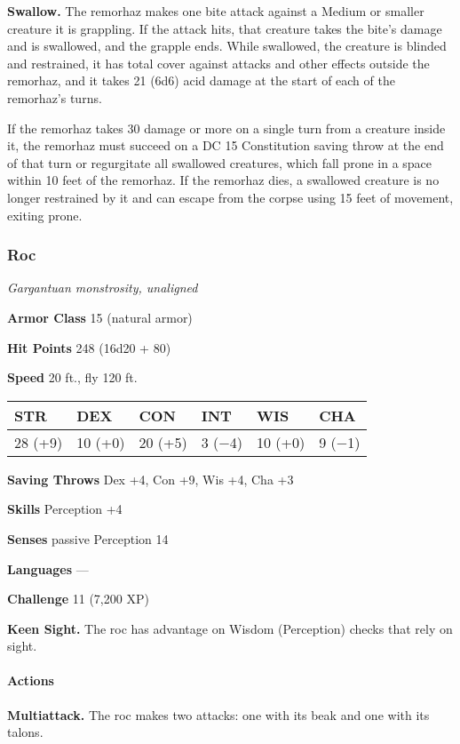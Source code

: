 \documentclass[
]{article}
\begin{document}
\textbf{Swallow.} The remorhaz makes one bite attack against a Medium or
smaller creature it is grappling. If the attack hits, that creature
takes the bite's damage and is swallowed, and the grapple ends. While
swallowed, the creature is blinded and restrained, it has total cover
against attacks and other effects outside the remorhaz, and it takes 21
(6d6) acid damage at the start of each of the remorhaz's turns.

If the remorhaz takes 30 damage or more on a single turn from a creature
inside it, the remorhaz must succeed on a DC 15 Constitution saving
throw at the end of that turn or regurgitate all swallowed creatures,
which fall prone in a space within 10 feet of the remorhaz. If the
remorhaz dies, a swallowed creature is no longer restrained by it and
can escape from the corpse using 15 feet of movement, exiting prone.

\hypertarget{roc}{%
\subsubsection{Roc}\label{roc}}

\emph{Gargantuan monstrosity, unaligned}

\textbf{Armor Class} 15 (natural armor)

\textbf{Hit Points} 248 (16d20 + 80)

\textbf{Speed} 20 ft., fly 120 ft.

\begin{longtable}[]{@{}llllll@{}}
\toprule
STR & DEX & CON & INT & WIS & CHA\tabularnewline
\midrule
\endhead
28 (+9) & 10 (+0) & 20 (+5) & 3 (−4) & 10 (+0) & 9 (−1)\tabularnewline
\bottomrule
\end{longtable}

\textbf{Saving Throws} Dex +4, Con +9, Wis +4, Cha +3

\textbf{Skills} Perception +4

\textbf{Senses} passive Perception 14

\textbf{Languages} ---

\textbf{Challenge} 11 (7,200 XP)

\textbf{Keen Sight.} The roc has advantage on Wisdom (Perception) checks
that rely on sight.

\hypertarget{actions-2}{%
\paragraph{Actions}\label{actions-2}}

\textbf{Multiattack.} The roc makes two attacks: one with its beak and
one with its talons.
\end{document}
